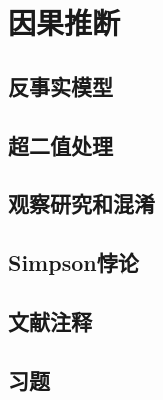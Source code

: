 \chapter{因果推断}

\section{反事实模型}

\pending

\section{超二值处理}

\pending

\section{观察研究和混淆}

\pending

\section{Simpson悖论}

\pending

\section{文献注释}

\pending

\section{习题}

\pending

